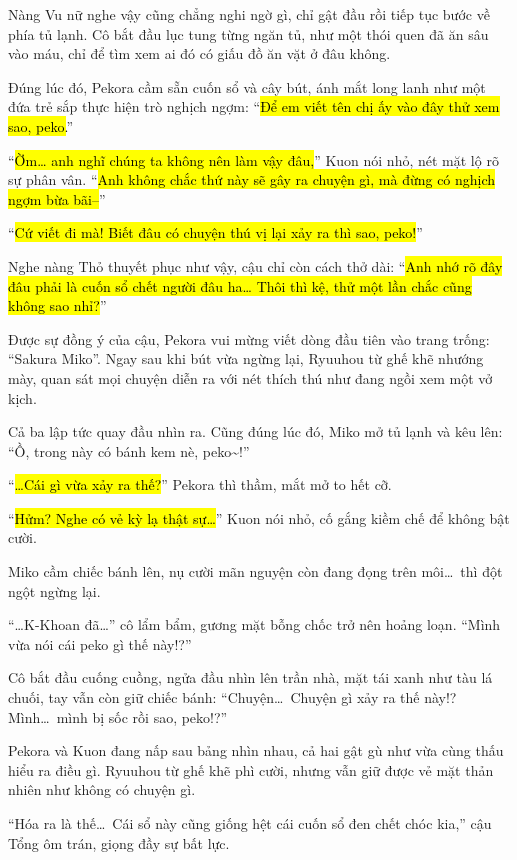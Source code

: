 \documentclass[../main.tex]{subfiles}
\begin{document}
Nàng Vu nữ nghe vậy cũng chẳng nghi ngờ gì, chỉ gật đầu rồi tiếp tục bước về phía tủ lạnh. Cô bắt đầu lục tung từng ngăn tủ, như một thói quen đã ăn sâu vào máu, chỉ để tìm xem ai đó có giấu đồ ăn vặt ở đâu không.

Đúng lúc đó, Pekora cầm sẵn cuốn sổ và cây bút, ánh mắt long lanh như một đứa trẻ sắp thực hiện trò nghịch ngợm: ``\hl{Để em viết tên chị ấy vào đây thử xem sao, peko.}''

``\hl{Ờm\dots{} anh nghĩ chúng ta không nên làm vậy đâu,}'' Kuon nói nhỏ, nét mặt lộ rõ sự phân vân. ``\hl{Anh không chắc thứ này sẽ gây ra chuyện gì, mà đừng có nghịch ngợm bừa bãi--}''

``\hl{Cứ viết đi mà! Biết đâu có chuyện thú vị lại xảy ra thì sao, peko!}''

Nghe nàng Thỏ thuyết phục như vậy, cậu chỉ còn cách thở dài: ``\hl{Anh nhớ rõ đây đâu phải là cuốn sổ chết người đâu ha\dots{} Thôi thì kệ, thử một lần chắc cũng không sao nhỉ?}''

Được sự đồng ý của cậu, Pekora vui mừng viết dòng đầu tiên vào trang trống: ``Sakura Miko''. Ngay sau khi bút vừa ngừng lại, Ryuuhou từ ghế khẽ nhướng mày, quan sát mọi chuyện diễn ra với nét thích thú như đang ngồi xem một vở kịch.

Cả ba lập tức quay đầu nhìn ra. Cũng đúng lúc đó, Miko mở tủ lạnh và kêu lên: ``Ồ, trong này có bánh kem nè, peko\~{}!''

``\hl{\dots Cái gì vừa xảy ra thế?}'' Pekora thì thầm, mắt mở to hết cỡ.

``\hl{Hửm? Nghe có vẻ kỳ lạ thật sự\dots}'' Kuon nói nhỏ, cố gắng kiềm chế để không bật cười.

Miko cầm chiếc bánh lên, nụ cười mãn nguyện còn đang đọng trên môi\dots\ thì đột ngột ngừng lại.

``\dots K-Khoan đã\dots'' cô lẩm bẩm, gương mặt bỗng chốc trở nên hoảng loạn. ``Mình vừa nói cái peko gì thế này!?''

Cô bắt đầu cuống cuồng, ngửa đầu nhìn lên trần nhà, mặt tái xanh như tàu lá chuối, tay vẫn còn giữ chiếc bánh: ``Chuyện\dots\ Chuyện gì xảy ra thế này!? Mình\dots\ mình bị sốc rồi sao, peko!?''


Pekora và Kuon đang nấp sau bảng nhìn nhau, cả hai gật gù như vừa cùng thấu hiểu ra điều gì. Ryuuhou từ ghế khẽ phì cười, nhưng vẫn giữ được vẻ mặt thản nhiên như không có chuyện gì.

``Hóa ra là thế\dots\ Cái sổ này cũng giống hệt cái cuốn sổ đen chết chóc kia,'' cậu Tổng ôm trán, giọng đầy sự bất lực.
\end{document}
